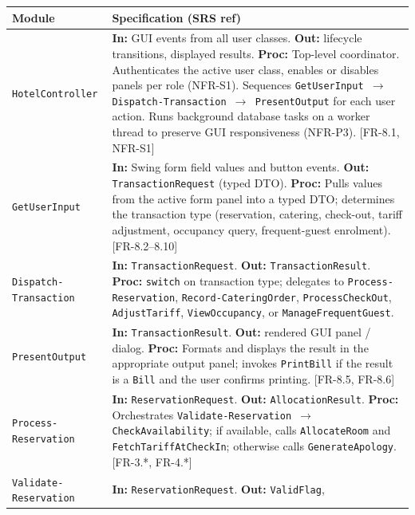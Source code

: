\documentclass[12pt,a4paper]{article}
\renewcommand{\thead}[1]{%
  \cellcolor{tableheadbg}\color{white}\textbf{#1}%
}
\begin{document}
\begin{longtable}{|L{3.2cm}|L{10.5cm}|}
  \hline
  \thead{Module} & \thead{Specification (SRS ref)} \\
  \hline
  \endhead
  \hline
  \endfoot
  \texttt{HotelController}
    & \textbf{In:} GUI events from all user classes. \textbf{Out:} lifecycle transitions,
      displayed results.
      \textbf{Proc:} Top-level coordinator. Authenticates the active user class, enables
      or disables panels per role (NFR-S1). Sequences
      \texttt{GetUserInput $\to$ Dispatch-Transaction $\to$ PresentOutput} for each
      user action. Runs background database tasks on a worker thread to preserve GUI
      responsiveness (NFR-P3). [FR-8.1, NFR-S1] \\
  \hline
  \texttt{GetUserInput}
    & \textbf{In:} Swing form field values and button events. \textbf{Out:}
      \texttt{TransactionRequest} (typed DTO).
      \textbf{Proc:} Pulls values from the active form panel into a typed DTO;
      determines the transaction type (reservation, catering, check-out, tariff
      adjustment, occupancy query, frequent-guest enrolment). [FR-8.2--8.10] \\
  \hline
  \texttt{Dispatch-
  Transaction}
    & \textbf{In:} \texttt{TransactionRequest}. \textbf{Out:} \texttt{TransactionResult}.
      \textbf{Proc:} \texttt{switch} on transaction type; delegates to
      \texttt{Process-Reservation}, \texttt{Record-CateringOrder},
      \texttt{ProcessCheckOut}, \texttt{AdjustTariff}, \texttt{ViewOccupancy}, or
      \texttt{ManageFrequentGuest}. \\
  \hline
  \texttt{PresentOutput}
    & \textbf{In:} \texttt{TransactionResult}. \textbf{Out:} rendered GUI panel / dialog.
      \textbf{Proc:} Formats and displays the result in the appropriate output panel;
      invokes \texttt{PrintBill} if the result is a \texttt{Bill} and the user confirms
      printing. [FR-8.5, FR-8.6] \\
  \hline
  \texttt{Process-
  Reservation}
    & \textbf{In:} \texttt{ReservationRequest}. \textbf{Out:} \texttt{AllocationResult}.
      \textbf{Proc:} Orchestrates \texttt{Validate-Reservation $\to$ CheckAvailability};
      if available, calls \texttt{AllocateRoom} and \texttt{FetchTariffAtCheckIn};
      otherwise calls \texttt{GenerateApology}. [FR-3.*, FR-4.*] \\
  \hline
  \texttt{Validate-
  Reservation}
    & \textbf{In:} \texttt{ReservationRequest}. \textbf{Out:} \texttt{ValidFlag},

\end{longtable}
\end{document}
